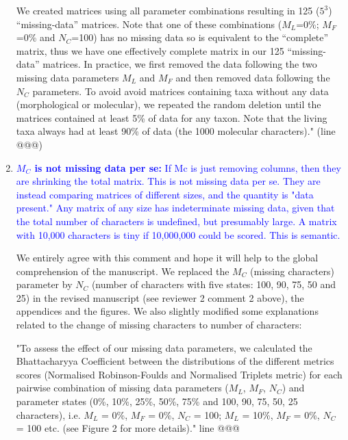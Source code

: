 \documentclass[12pt,letterpaper]{article}
\begin{document}
\begin{enumerate}
We created matrices using all parameter combinations resulting in 125 ($5^3$) “missing-data” matrices. Note that one of these combinations ($M_L$=0\%; $M_F$=0\% and $N_C$=100) has no missing data so is equivalent to the “complete” matrix, thus we have one effectively complete matrix in our 125 “missing-data” matrices. In practice, we first removed the data following the two missing data parameters $M_L$ and $M_F$ and then removed data following the $N_C$ parameters. To avoid avoid matrices containing taxa without any data (morphological or molecular), we repeated the random deletion until the matrices contained at least 5\% of data for any taxon. Note that the living taxa always had at least 90\% of data (the 1000 molecular characters)." (line @@@)

\item{\textcolor{blue}{\textbf{$M_C$ is not missing data per se:} If Mc is just removing columns, then they are shrinking the total matrix. This is not missing data per se. They are instead comparing matrices of different sizes, and the quantity is "data present." Any matrix of any size has indeterminate missing data, given that the total number of characters is undefined, but presumably large. A matrix with 10,000 characters is tiny if 10,000,000 could be scored. This is semantic.}}

We entirely agree with this comment and hope it will help to the global comprehension of the manuscript. We replaced the $M_C$ (missing characters) parameter by $N_C$ (number of characters with five states: 100, 90, 75, 50 and 25) in the revised manuscript (see reviewer 2 comment 2 above), the appendices and the figures. We also slightly modified some explanations related to the change of missing characters to number of characters:

"To assess the effect of our missing data parameters, we calculated the Bhattacharyya Coefficient between the distributions of the different metrics scores (Normalised Robinson-Foulds and Normalised Triplets metric) for each pairwise combination of missing data parameters ($M_{L}$, $M_{F}$, $N_{C}$) and parameter states (0\%, 10\%, 25\%, 50\%, 75\% and 100, 90, 75, 50, 25 characters), i.e. $M_{L}$ = 0\%, $M_{F}$ = 0\%, $N_{C}$ = 100; $M_{L}$ = 10\%, $M_{F}$ = 0\%, $N_{C}$ = 100 etc. (see Figure 2 for more details)." line @@@


\end{enumerate}
\end{document}
